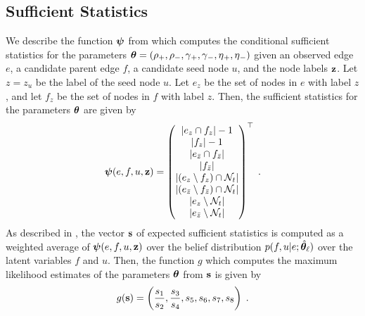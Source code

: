 \documentclass[aps,pre,reprint,superscriptaddress,nofootinbib]{revtex4-2}
\begin{document}
    \subsection{Sufficient Statistics}
        We describe the function $\boldsymbol{\psi}$ from  which computes the conditional sufficient statistics for the parameters $\boldsymbol{\theta} = (\rho{}_+, \rho{}_-, \gamma{}_+, \gamma{}_-, \eta{}_+, \eta{}_-)$ given an observed edge $e$, a candidate parent edge $f$, a candidate seed node $u$, and the node labels $\mathbf{z}$. 
        Let $z = z_u$ be the label of the seed node $u$. 
        Let $e_z$ be the set of nodes in $e$ with label $z$, and let $f_z$ be the set of nodes in $f$ with label $z$. 
        Then, the sufficient statistics for the parameters $\boldsymbol{\theta}$ \cite{degrootProbabilityStatistics2012}  are given by
        \begin{align*}
            \boldsymbol{\psi}(e, f, u, \mathbf{z}) = \begin{pmatrix}
                \left| e_z \cap f_z \right| - 1 \\ 
                \left| f_z \right| - 1 \\ 
                \left| e_{\bar{z}} \cap f_{\bar{z}} \right| \\
                \left| f_{\bar{z}} \right|  \\ 
                \left| (e_z \setminus f_z) \cap \mathcal{N}_{t} \right| \\ 
                \left| (e_{\bar{z}} \setminus f_{\bar{z}})\cap \mathcal{N}_{t} \right| \\
                \left| e_z \setminus \mathcal{N}_{t} \right| \\
                \left| e_{\bar{z}} \setminus \mathcal{N}_{t} \right|
            \end{pmatrix}^\top \;.
        \end{align*}
        As described in , the vector $\mathbf{s}$ of expected sufficient statistics is computed as a weighted average of $\boldsymbol{\psi}(e, f, u, \mathbf{z})$ over the belief distribution $p(f, u | e; \hat{\boldsymbol{\theta}}_{\ell})$ over the latent variables $f$ and $u$.
        Then, the function $g$ which computes the maximum likelihood estimates of the parameters $\boldsymbol{\theta}$ from $\mathbf{s}$ is given by
        \begin{align*}
            g(\mathbf{s}) = \left( 
                \frac{s_1}{s_2}, 
                \frac{s_3}{s_4}, 
                s_5, 
                s_6, 
                s_7, 
                s_8
             \right)
             \;.
        \end{align*}
    
\end{document}

